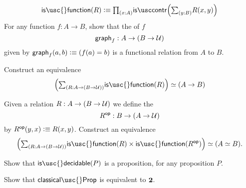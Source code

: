 \begin{exercises}
\begin{subexenum}
\begin{equation*}
\mathsf{is\usc{}function}(R) \defeq \prd{x:A}\iscontr\Big(\sm{y:B}R(x,y)\Big)
\end{equation*}
For any function $f:A\to B$, show that the  of $f$ 
\begin{equation*}
\mathsf{graph}_f:A\to (B\to \mathcal{U})
\end{equation*}
given by $\mathsf{graph}_f(a,b)\vcentcolon\equiv (f(a)=b)$ is a functional relation from $A$ to $B$.
\item Construct an equivalence
\begin{equation*}
\eqv{\Big(\sm{R:A\to (B\to\UU)}\mathsf{is\usc{}function}(R)\Big)}{(A\to B)}
\end{equation*}
\item Given a relation $R:A\to (B\to \mathcal{U})$ we define the 
\begin{equation*}
R^{\mathsf{op}} : B\to (A\to\mathcal{U})
\end{equation*}
by $R^{\mathsf{op}}(y,x)\vcentcolon\equiv R(x,y)$. Construct an equivalence
\begin{equation*}
\eqv{\Big(\sm{R:A\to (B\to \UU)}\mathsf{is\usc{}function}(R)\times\mathsf{is\usc{}function}(R^{\mathsf{op}})\Big)}{(\eqv{A}{B})}.
\end{equation*}
\end{subexenum}
\item
  \begin{subexenum}
  \item Show that $\mathsf{is\usc{}decidable}(P)$ is a proposition, for any proposition $P$.
  \item Show that $\mathsf{classical\usc{}Prop}$ is equivalent to $\mathbf{2}$.
  \end{subexenum}
\end{exercises}
